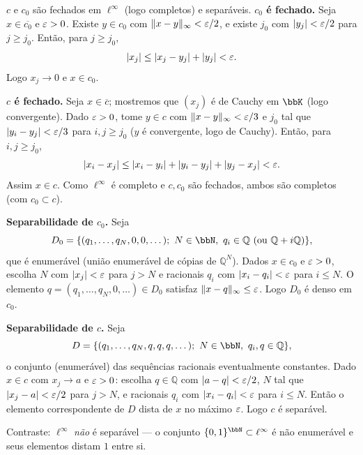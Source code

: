 \begin{exercicio}{$c$ e $c_0$ são fechados em $\ell^\infty$ (logo completos) e separáveis.}
\sol
\textbf{$c_0$ é fechado.} Seja $x\in\overline{c_0}$ e $\varepsilon>0$. Existe $y\in c_0$ com $\lVert x-y\rVert_\infty<\varepsilon/2$, e existe $j_0$ com $\lvert y_j\rvert<\varepsilon/2$ para $j\ge j_0$. Então, para $j\ge j_0$,
\[ \lvert x_j\rvert\le\lvert x_j-y_j\rvert+\lvert y_j\rvert<\varepsilon. \]
Logo $x_j\to0$ e $x\in c_0$.

\textbf{$c$ é fechado.} Seja $x\in\overline{c}$; mostremos que $(x_j)$ é de Cauchy em $\bbK$ (logo convergente). Dado $\varepsilon>0$, tome $y\in c$ com $\lVert x-y\rVert_\infty<\varepsilon/3$ e $j_0$ tal que $\lvert y_i-y_j\rvert<\varepsilon/3$ para $i,j\ge j_0$ ($y$ é convergente, logo de Cauchy). Então, para $i,j\ge j_0$,
\[ \lvert x_i-x_j\rvert\le\lvert x_i-y_i\rvert+\lvert y_i-y_j\rvert+\lvert y_j-x_j\rvert<\varepsilon. \]
Assim $x\in c$. Como $\ell^\infty$ é completo e $c,c_0$ são fechados, ambos são completos (com $c_0\subset c$).

\textbf{Separabilidade de $c_0$.} Seja
\[ D_0=\{(q_1,\dots,q_N,0,0,\dots);\ N\in\N,\ q_i\in\mathbb{Q}\ (\text{ou } \mathbb{Q}+i\mathbb{Q})\}, \]
que é enumerável (união enumerável de cópias de $\mathbb{Q}^N$). Dados $x\in c_0$ e $\varepsilon>0$, escolha $N$ com $\lvert x_j\rvert<\varepsilon$ para $j>N$ e racionais $q_i$ com $\lvert x_i-q_i\rvert<\varepsilon$ para $i\le N$. O elemento $q=(q_1,\dots,q_N,0,\dots)\in D_0$ satisfaz $\lVert x-q\rVert_\infty\le\varepsilon$. Logo $D_0$ é denso em $c_0$.

\textbf{Separabilidade de $c$.} Seja
\[ D=\{(q_1,\dots,q_N,q,q,q,\dots);\ N\in\N,\ q_i,q\in\mathbb{Q}\}, \]
o conjunto (enumerável) das sequências racionais eventualmente constantes. Dado $x\in c$ com $x_j\to a$ e $\varepsilon>0$: escolha $q\in\mathbb{Q}$ com $\lvert a-q\rvert<\varepsilon/2$, $N$ tal que $\lvert x_j-a\rvert<\varepsilon/2$ para $j>N$, e racionais $q_i$ com $\lvert x_i-q_i\rvert<\varepsilon$ para $i\le N$. Então o elemento correspondente de $D$ dista de $x$ no máximo $\varepsilon$. Logo $c$ é separável.

\begin{obs}
Contraste: $\ell^\infty$ \emph{não} é separável --- o conjunto $\{0,1\}^\N\subset \ell^\infty$ é não enumerável e seus elementos distam $1$ entre si.
\end{obs}
\end{exercicio}

